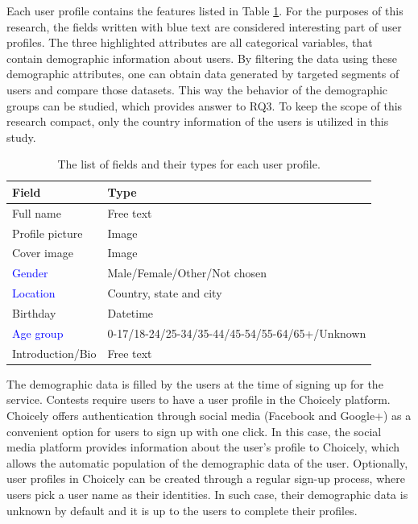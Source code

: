Each user profile contains the features listed in Table \ref{user_profile_fields}. For the purposes of this research, the fields written with blue text are considered interesting part of user profiles. The three highlighted attributes are all categorical variables, that contain demographic information about users. By filtering the data using these demographic attributes, one can obtain data generated by targeted segments of users and compare those datasets. This way the behavior of the demographic groups can be studied, which provides answer to RQ3. To keep the scope of this research compact, only the country information of the users is utilized in this study.

\begin{table}[H]
    \centering
    \begin{adjustbox}{width=0.8\textwidth}
        \begin{tabular}{l|l}
            \textbf{Field}              & \textbf{Type} \\
            \hline
            Full name                   & Free text \\
            Profile picture             & Image \\ 
            Cover image                 & Image \\
            \textcolor{blue}{Gender}    & Male/Female/Other/Not chosen \\
            \textcolor{blue}{Location}  & Country, state and city \\
            Birthday                    & Datetime \\ 
            \textcolor{blue}{Age group} & 0-17/18-24/25-34/35-44/45-54/55-64/65+/Unknown \\
            Introduction/Bio            & Free text
        \end{tabular}
    \end{adjustbox}
    \caption{The list of fields and their types for each user profile.}
    \label{user_profile_fields}
\end{table}  

The demographic data is filled by the users at the time of signing up for the service. Contests require users to have a user profile in the Choicely platform. Choicely offers authentication through social media (Facebook and Google+) as a convenient option for users to sign up with one click. In this case, the social media platform provides information about the user's profile to Choicely, which allows the automatic population of the demographic data of the user. Optionally, user profiles in Choicely can be created through a regular sign-up process, where users pick a user name as their identities. In such case, their demographic data is unknown by default and it is up to the users to complete their profiles. 

